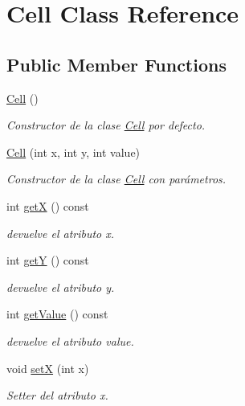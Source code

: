 \hypertarget{class_cell}{\section{Cell Class Reference}
\label{class_cell}
}
\subsection*{Public Member Functions}
\begin{DoxyCompactItemize}
\item 
\hyperlink{class_cell_a394510643e8664cf12b5efaf5cb99f71}{Cell} ()
\begin{DoxyCompactList}\small\item\em Constructor de la clase \hyperlink{class_cell}{Cell} por defecto. \end{DoxyCompactList}\item 
\hyperlink{class_cell_aa4c34c694dde0a9f3729f86775a57aa0}{Cell} (int x, int y, int value)
\begin{DoxyCompactList}\small\item\em Constructor de la clase \hyperlink{class_cell}{Cell} con parámetros. \end{DoxyCompactList}\item 
int \hyperlink{class_cell_a78d82b277e8fb2e1c3e70286bcc85314}{get\-X} () const 
\begin{DoxyCompactList}\small\item\em devuelve el atributo x. \end{DoxyCompactList}\item 
int \hyperlink{class_cell_a2df3d69f5d0c10a1e1f02c5f89045e0a}{get\-Y} () const 
\begin{DoxyCompactList}\small\item\em devuelve el atributo y. \end{DoxyCompactList}\item 
int \hyperlink{class_cell_a1a906844dab60dbd4f3590194d8a81bb}{get\-Value} () const 
\begin{DoxyCompactList}\small\item\em devuelve el atributo value. \end{DoxyCompactList}\item 
void \hyperlink{class_cell_af6cc63822a2cf6a5acef52c030316cbe}{set\-X} (int x)
\begin{DoxyCompactList}\small\item\em Setter del atributo x. \end{DoxyCompactList}\item 

\end{DoxyCompactItemize}
